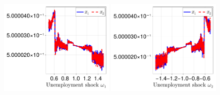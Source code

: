 \documentclass[12pt,a4paper]{article}
\begin{document}
\begin{figure}[H]
\centering
\includegraphics[width=0.49\textwidth]{figures/V9/γ=1.0-μ_0=0.5-α=0.0/fig_optimal_x_by_ω_1.pdf}
\includegraphics[width=0.49\textwidth]{figures/V9/γ=1.0-μ_0=0.5-α=0.0/fig_optimal_x_by_ω_2.pdf}
\end{figure}
\end{document}
